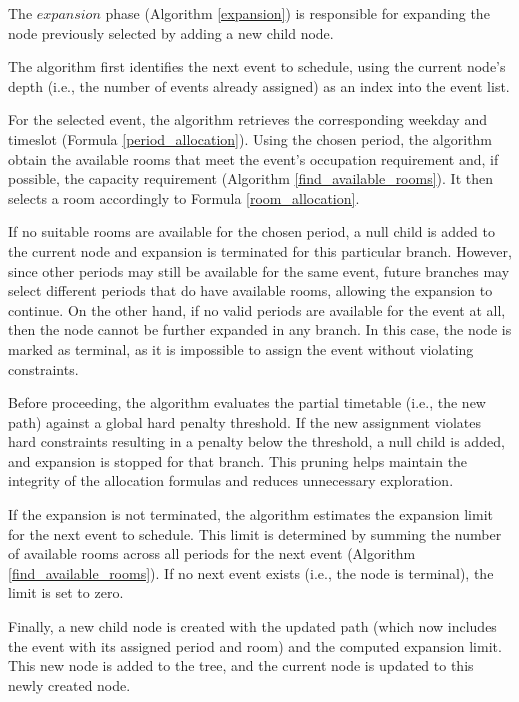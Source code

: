The \(expansion\) phase (Algorithm \ref{expansion}) is responsible for expanding the node previously selected by adding a new child node. 

The algorithm first identifies the next event to schedule, using the current node's depth (i.e., the number of events already assigned) as an index into the event list. %

For the selected event, the algorithm retrieves the corresponding weekday and timeslot (Formula \ref{period_allocation}). Using the chosen period, the algorithm obtain the available rooms that meet the event’s occupation requirement and, if possible, the capacity requirement (Algorithm \ref{find_available_rooms}). It then selects a room accordingly to Formula \ref{room_allocation}. 

If no suitable rooms are available for the chosen period, a null child is added to the current node and expansion is terminated for this particular branch. However, since other periods may still be available for the same event, future branches may select different periods that do have available rooms, allowing the expansion to continue. On the other hand, if no valid periods are available for the event at all, then the node cannot be further expanded in any branch. In this case, the node is marked as terminal, as it is impossible to assign the event without violating constraints.

Before proceeding, the algorithm evaluates the partial timetable (i.e., the new path) against a global hard penalty threshold. If the new assignment violates hard constraints resulting in a penalty below the threshold, a null child is added, and expansion is stopped for that branch. This pruning helps maintain the integrity of the allocation formulas and reduces unnecessary exploration.

If the expansion is not terminated, the algorithm estimates the expansion limit for the next event to schedule. This limit is determined by summing the number of available rooms across all periods for the next event (Algorithm \ref{find_available_rooms}). If no next event exists (i.e., the node is terminal), the limit is set to zero.

Finally, a new child node is created with the updated path (which now includes the event with its assigned period and room) and the computed expansion limit. This new node is added to the tree, and the current node is updated to this newly created node.

